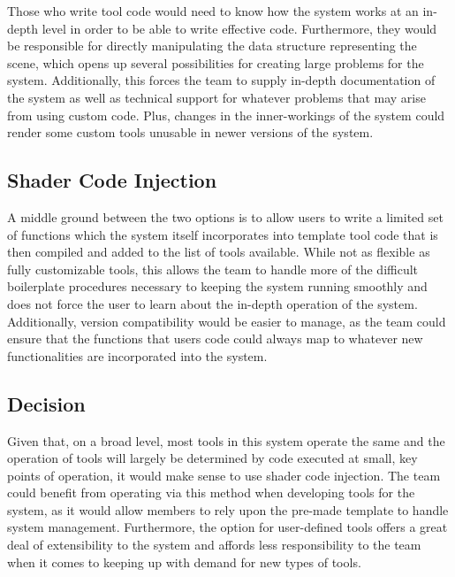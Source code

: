 \documentclass[onecolumn, draftclsnofoot,10pt, compsoc]{IEEEtran}
\begin{document}
Those who write tool code would need to know how the system works at an in-depth level in order to be able to write effective code.
Furthermore, they would be responsible for directly manipulating the data structure representing the scene, which opens up several possibilities for creating large problems for the system.
Additionally, this forces the team to supply in-depth documentation of the system as well as technical support for whatever problems that may arise from using custom code.
Plus, changes in the inner-workings of the system could render some custom tools unusable in newer versions of the system.


\subsection{Shader Code Injection}

A middle ground between the two options is to allow users to write a limited set of functions which the system itself incorporates into template tool code that is then compiled and added to the list of tools available.
While not as flexible as fully customizable tools, this allows the team to handle more of the difficult boilerplate procedures necessary to keeping the system running smoothly and does not force the user to learn about the in-depth operation of the system.
Additionally, version compatibility would be easier to manage, as the team could ensure that the functions that users code could always map to whatever new functionalities are incorporated into the system.



\subsection{Decision}

Given that, on a broad level, most tools in this system operate the same and the operation of tools will largely be determined by code executed at small, key points of operation, it would make sense to use shader code injection.
The team could benefit from operating via this method when developing tools for the system, as it would allow members to rely upon the pre-made template to handle system management.
Furthermore, the option for user-defined tools offers a great deal of extensibility to the system and affords less responsibility to the team when it comes to keeping up with demand for new types of tools.



{}
\end{document}
